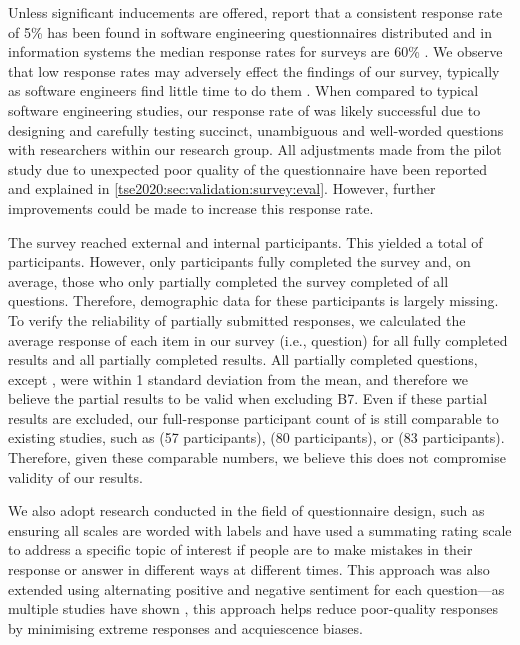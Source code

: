 Unless significant inducements are offered, \citet{Singer:2007tu} report that a consistent response rate of 5\% has been found in software engineering questionnaires distributed and in information systems the median response rates for surveys are 60\% \citep{Baruch:1999vf}. We observe that low response rates may adversely effect the findings of our survey, typically as software engineers find little time to do them \citep{Singer:2007tu}. When compared to typical software engineering studies, our response rate of \SurveyParticipantsTotalResponseRate{} was likely successful due to designing and carefully testing succinct, unambiguous and well-worded questions with  researchers within our research group. All adjustments made from the pilot study due to unexpected poor quality of the questionnaire have been reported and explained in \cref{tse2020:sec:validation:survey:eval}. However, further improvements could be made to increase this response rate.

The survey reached \SurveyParticipantsExternalTotal{} external and \SurveyParticipantsInternal{} internal participants. This yielded a total of \SurveyParticipantsTotal{} participants. However, only \SurveyParticipantsFullResponses{} participants fully completed the survey and, on average, those who only partially completed the survey completed \SurveyParticipantsExternalPartialResponsesCompletionRate{} of all questions. Therefore, demographic data for these participants is largely missing.
To verify the reliability of partially submitted responses, we calculated the average response of each item in our survey (i.e., question) for all fully completed results and all partially completed results. All partially completed questions, except , were within 1 standard deviation from the mean, and therefore we believe the  \SurveyParticipantsExternalPartialResponses{} partial results to be valid when excluding B7. Even if these partial results are excluded, our full-response participant count of \SurveyParticipantsFullResponses{} is still comparable to existing studies, such as \citet{Nykaza:2002td} (57 participants), \citet{Robillard:2011uv} (80 participants), or \citep{Robillard:2009uk} (83 participants). Therefore, given these comparable numbers, we believe this does not compromise validity of our results.

We also adopt research conducted in the field of questionnaire design, such as ensuring all scales are worded with labels \citep{Krosnick:1999wt} and have used a summating rating scale \citep{Spector:1992uj} to address a specific topic of interest if people are to make mistakes in their response or answer in different ways at different times. This approach was also extended using alternating positive and negative sentiment for each question---as multiple studies have shown \citep{Sauro:2011aj,Brooke:2013vt}, this approach helps reduce poor-quality responses by minimising extreme responses and acquiescence biases.

